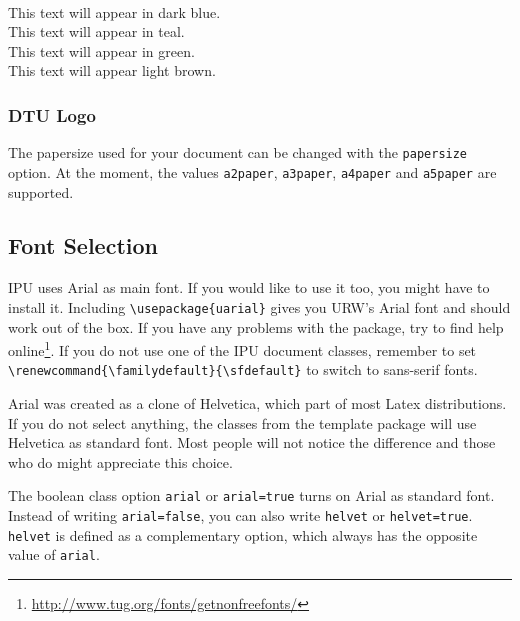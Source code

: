 \documentclass[short,comm,dots]{ipureport}
\begin{document}
~\\
{\color[rgb]{0.03707688311079281, 0.1575158489133046, 0.3665349648484976} This text will appear in dark blue.} \\
{\color[rgb]{0.0, 0.45177932391406056, 0.42070350628569453} This text will appear in teal.} \\
{\color[rgb]{0.10636981679961377, 0.7030871213847766, 0.22340721209323416} This text will appear in green.} \\
{\color[rgb]{0.6282884950424713, 0.7739775224607538, 0.24559323885034906} This text will appear light brown.} \\


\subsubsection{DTU Logo}


The papersize used for your document can be changed with the \texttt{papersize} option. At the moment, the values \texttt{a2paper}, \texttt{a3paper}, \texttt{a4paper} and \texttt{a5paper} are supported. 

\subsection{Font Selection}
IPU uses Arial as main font. If you would like to use it too, you might have to install it. Including \texttt{\textbackslash{}usepackage\{uarial\}} gives you URW's Arial font and should work out of the box. If you have any problems with the package, try to find help online\footnote{\url{http://www.tug.org/fonts/getnonfreefonts/}}. If you do not use one of the IPU document classes, remember to set \texttt{\textbackslash{}renewcommand\{\textbackslash{}familydefault\}\{\textbackslash{}sfdefault\}} to switch to sans-serif fonts. 

Arial was created as a clone of Helvetica, which part of most Latex distributions. If you do not select anything, the classes from the template package will use Helvetica as standard font. Most people will not notice the difference and those who do might appreciate this choice. 

The boolean class option \texttt{arial} or \texttt{arial=true} turns on Arial as standard font. Instead of writing \texttt{arial=false}, you can also write \texttt{helvet} or \texttt{helvet=true}. \texttt{helvet} is defined as a complementary option, which always has the opposite value of \texttt{arial}. 
\end{document}
